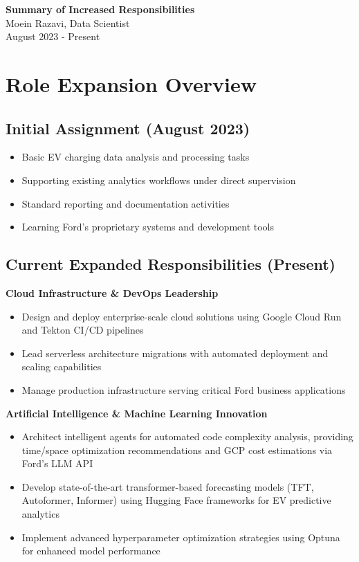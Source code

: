 \documentclass[11pt,a4paper]{article}
\begin{document}
\begin{center}
{\LARGE\bfseries Summary of Increased Responsibilities} \\[0.3cm]
{\large Moein Razavi, Data Scientist} \\[0.1cm]
{\normalsize August 2023 - Present} \\[0.2cm]

\end{center}

\vspace{0.5cm}

\section{Role Expansion Overview}

\subsection{Initial Assignment (August 2023)}
\begin{itemize}
    \item Basic EV charging data analysis and processing tasks
    \item Supporting existing analytics workflows under direct supervision
    \item Standard reporting and documentation activities
    \item Learning Ford's proprietary systems and development tools
\end{itemize}

\subsection{Current Expanded Responsibilities (Present)}

\noindent\textbf{Cloud Infrastructure \& DevOps Leadership}
\begin{itemize}
    \item Design and deploy enterprise-scale cloud solutions using Google Cloud Run and Tekton CI/CD pipelines
    \item Lead serverless architecture migrations with automated deployment and scaling capabilities
    \item Manage production infrastructure serving critical Ford business applications
\end{itemize}

\noindent\textbf{Artificial Intelligence \& Machine Learning Innovation}
\begin{itemize}
    \item Architect intelligent agents for automated code complexity analysis, providing time/space optimization recommendations and GCP cost estimations via Ford's LLM API
    \item Develop state-of-the-art transformer-based forecasting models (TFT, Autoformer, Informer) using Hugging Face frameworks for EV predictive analytics
    \item Implement advanced hyperparameter optimization strategies using Optuna for enhanced model performance
\end{itemize}
\end{document}
